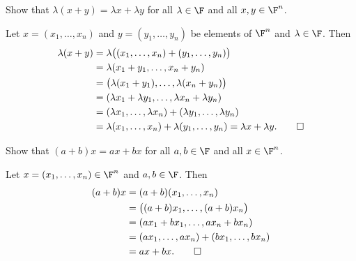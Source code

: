 \begin{exercise}
Show that $\lambda(x+y)=\lambda x+\lambda y$ for all $\lambda\in\F$ and all
$x,y\in\F^n$.
\end{exercise}
\begin{solution}
Let $x=(x_1,\dots,x_n)$ and $y=(y_1,\dots,y_n)$ be elements of $\F^n$ and
$\lambda\in\F$. Then
\begin{align*}
\lambda(x+y) &= \lambda\bigl((x_1,\dots,x_n)+(y_1,\dots,y_n)\bigr)\\
  &= \lambda(x_1+y_1,\dots,x_n+y_n)\\
  &= \bigl(\lambda(x_1+y_1),\dots,\lambda(x_n+y_n)\bigr)\\
  &= (\lambda x_1+\lambda y_1,\dots,\lambda x_n+\lambda y_n)\\
  &= (\lambda x_1,\dots,\lambda x_n)+(\lambda y_1,\dots,\lambda y_n)\\
  &= \lambda(x_1,\dots,x_n)+\lambda(y_1,\dots,y_n) = \lambda x+\lambda y. \qedhere
\end{align*}
\end{solution}

\begin{exercise}
Show that $(a+b)x=ax+bx$ for all $a,b\in\F$ and all $x\in\F^n$.
\end{exercise}
\begin{solution}
Let $x=(x_1,\dots,x_n)\in\F^n$ and $a,b\in\F$. Then
\begin{align*}
(a+b)x &= (a+b)(x_1,\dots,x_n)\\
       &= \bigl((a+b)x_1,\dots,(a+b)x_n\bigr)\\
       &= (ax_1+bx_1,\dots,ax_n+bx_n)\\
       &= (ax_1,\dots,ax_n)+(bx_1,\dots,bx_n)\\
       &= ax+bx. \qedhere
\end{align*}
\end{solution}

